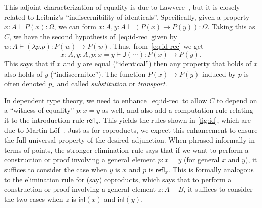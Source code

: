 \documentclass[10pt]{article}
\def\m#1{\llbracket#1\rrbracket}
\def\inl{\mathsf{inl}}
\def\refl{\mathsf{refl}}
\def\J{\mathsf{J}}
\def\types{\vdash}
\def\Id{\mathsf{Id}}
\numberwithin{equation}{section}
\begin{document}
This adjoint characterization of equality is due to Lawvere~\cite{lawvere:comprehension}, but it is closely related to Leibniz's ``indiscernibility of identicals''.
Specifically, given a property $x:A \types P(x):\Omega$, we can form $x:A, y:A \types (P(x)\to P(y)) :\Omega$.
Taking this as $C$, we have the second hypothesis of~\eqref{eq:id-rec} given by $w:A \types (\lambda p.p) : P(w) \to P(w)$.
Thus, from~\eqref{eq:id-rec} we get
\[x:A, y:A, p:x=y \types \J(\cdots) :  P(x) \to P(y).\]
This says that if $x$ and $y$ are equal (``identical'') then any property that holds of $x$ also holds of $y$ (``indiscernible'').
The function $P(x) \to P(y)$ induced by $p$ is often denoted $p_*$ and called \emph{substitution} or \emph{transport}.


In dependent type theory, we need to enhance~\eqref{eq:id-rec} to allow $C$ to depend on a ``witness of equality'' $p:x=y$ as well, and also add a computation rule relating it to the introduction rule $\refl_a$.
This yields the rules shown in \cref{fig:id}, which are due to Martin-L\"{o}f~\cite{martinlof:itt,martinlof:itt-pred}.
Just as for coproducts, we expect this enhancement to ensure the full universal property of the desired adjunction.
%
When phrased informally in terms of points, the stronger elimination rule says that if we want to perform a construction or proof involving a general element $p:x=y$ (for general $x$ and $y$), it suffices to consider the case when $y$ is $x$ and $p$ is $\refl_x$.
This is formally analogous to the elimination rule for (say) coproducts, which says that to perform a construction or proof involving a general element $z:A+B$, it suffices to consider the two cases when $z$ is $\inl(x)$ and $\inl(y)$.

\end{document}
